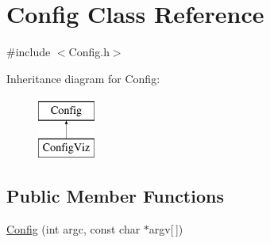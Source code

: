 \hypertarget{classConfig}{}\section{Config Class Reference}
\label{classConfig}


{\ttfamily \#include $<$Config.\+h$>$}

Inheritance diagram for Config\+:\begin{figure}[H]
\begin{center}
\leavevmode
\includegraphics[height=2.000000cm]{classConfig}
\end{center}
\end{figure}
\subsection*{Public Member Functions}
\begin{DoxyCompactItemize}
\item 
\mbox{\hyperlink{classConfig_a78cb21c58b4e4d3ffe4e2c1c580a6b33}{Config}} (int argc, const char $\ast$argv\mbox{[}$\,$\mbox{]})
\end{DoxyCompactItemize}
